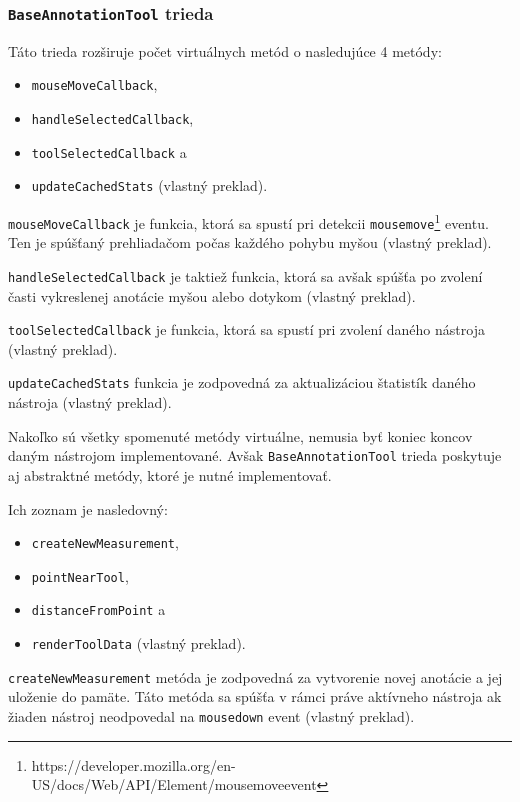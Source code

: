 \subsubsection* {\texttt{BaseAnnotationTool} trieda}
Táto trieda rozširuje počet virtuálnych metód o nasledujúce 4 metódy:
\begin {itemize}
\item {\texttt{mouseMoveCallback},}
\item {\texttt{handleSelectedCallback},}
\item {\texttt{toolSelectedCallback} a}
\item {\texttt{updateCachedStats} \cite{base_tool_description} (vlastný preklad).}
\end {itemize}

\texttt{mouseMoveCallback} je funkcia, ktorá sa spustí pri detekcii \texttt{mousemove}\footnote{https://developer.mozilla.org/en-US/docs/Web/API/Element/mousemove\textunderscore event} eventu. Ten je spúšťaný prehliadačom počas každého pohybu myšou \cite{base_tool_description} (vlastný preklad).

\texttt{handleSelectedCallback} je taktiež funkcia, ktorá sa avšak spúšťa po zvolení časti vykreslenej anotácie myšou alebo dotykom \cite{base_tool_description} (vlastný preklad).

\texttt{toolSelectedCallback} je funkcia, ktorá sa spustí pri zvolení daného nástroja \cite{base_tool_description} (vlastný preklad).

\texttt{updateCachedStats} funkcia je zodpovedná za aktualizáciou štatistík daného nástroja \cite{base_tool_description} (vlastný preklad).

Nakoľko sú všetky spomenuté metódy virtuálne, nemusia byť koniec koncov daným nástrojom implementované. Avšak \texttt{BaseAnnotationTool} trieda poskytuje aj abstraktné metódy, ktoré je nutné implementovať.

Ich zoznam je nasledovný:
\begin {itemize}
\item {\texttt{createNewMeasurement},}
\item {\texttt{pointNearTool},}
\item {\texttt{distanceFromPoint} a}
\item {\texttt{renderToolData} \cite{base_tool_description} (vlastný preklad).}
\end {itemize}

\texttt{createNewMeasurement} metóda je zodpovedná za vytvorenie novej anotácie a jej uloženie do pamäte. Táto metóda sa spúšťa v rámci práve aktívneho nástroja ak žiaden nástroj neodpovedal na \texttt{mousedown} event \cite{base_tool_description} (vlastný preklad).

